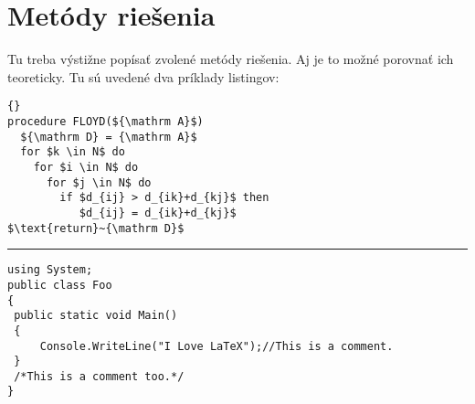 \chapter{Metódy riešenia}

Tu treba výstižne popísať zvolené metódy riešenia. Aj je to možné porovnať ich teoreticky.
Tu sú uvedené dva príklady listingov:

\begin{lstlisting}[mathescape]{}
procedure FLOYD(${\mathrm A}$)
  ${\mathrm D} = {\mathrm A}$
  for $k \in N$ do 
    for $i \in N$ do 
      for $j \in N$ do
        if $d_{ij} > d_{ik}+d_{kj}$ then
           $d_{ij} = d_{ik}+d_{kj}$
$\text{return}~{\mathrm D}$
\end{lstlisting}


\hrule

%
\begin{lstlisting}
using System;
public class Foo
{
 public static void Main()
 {
     Console.WriteLine("I Love LaTeX");//This is a comment.
 }
 /*This is a comment too.*/
}
\end{lstlisting}



